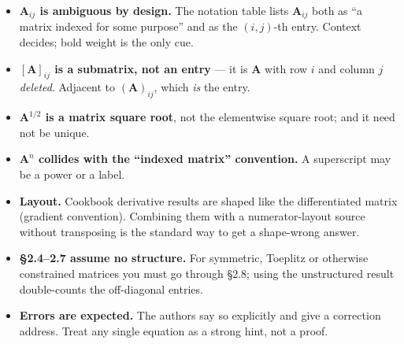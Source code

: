 \documentclass[10pt,a4paper]{article}
\begin{document}
\begin{itemize}
\item \textbf{$\mathbf{A}_{ij}$ is ambiguous by design.}  The notation table lists
      $\mathbf{A}_{ij}$ both as ``a matrix indexed for some purpose'' and as the
      $(i,j)$-th entry.  Context decides; bold weight is the only cue.
\item \textbf{$[\mathbf{A}]_{ij}$ is a submatrix, not an entry} --- it is $\mathbf{A}$
      with row $i$ and column $j$ \emph{deleted}.  Adjacent to $(\mathbf{A})_{ij}$,
      which \emph{is} the entry.
\item \textbf{$\mathbf{A}^{1/2}$ is a matrix square root}, not the elementwise square
      root; and it need not be unique.
\item \textbf{$\mathbf{A}^{n}$ collides with the ``indexed matrix'' convention.}  A
      superscript may be a power or a label.
\item \textbf{Layout.}  Cookbook derivative results are shaped like the differentiated
      matrix (gradient convention).  Combining them with a numerator-layout source
      without transposing is the standard way to get a shape-wrong answer.
\item \textbf{\S2.4--2.7 assume no structure.}  For symmetric, Toeplitz or otherwise
      constrained matrices you must go through \S2.8; using the unstructured result
      double-counts the off-diagonal entries.
\item \textbf{Errors are expected.}  The authors say so explicitly and give a
      correction address.  Treat any single equation as a strong hint, not a proof.
\end{itemize}
\end{document}
